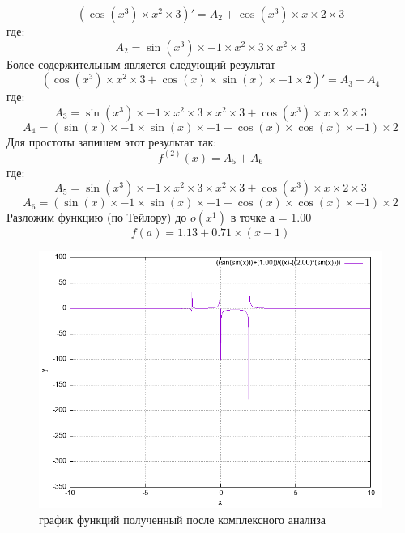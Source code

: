 \documentclass{article}
\begin{document}
\[(\cos( x ^{ 3 })\times x ^{ 2 }\times 3 )' =  A_{2} +\cos( x ^{ 3 })\times x \times 2 \times 3 \]\newline
где:\[A_{2} = \sin( x ^{ 3 })\times -1 \times x ^{ 2 }\times 3 \times x ^{ 2 }\times 3 \]
Более содержительным является следующий результат\newline
\[(\cos( x ^{ 3 })\times x ^{ 2 }\times 3 +\cos( x )\times\sin( x )\times -1 \times 2 )' =  A_{3} + A_{4} \]\newline
где:\[A_{3} = \sin( x ^{ 3 })\times -1 \times x ^{ 2 }\times 3 \times x ^{ 2 }\times 3 +\cos( x ^{ 3 })\times x \times 2 \times 3 \]
\[A_{4} = (\sin( x )\times -1 \times\sin( x )\times -1 +\cos( x )\times\cos( x )\times -1 )\times 2 \]
Для простоты запишем этот результат так:\newline
\[f^{(2)}(x) =  A_{5} + A_{6} \]\newline
где:\[A_{5} = \sin( x ^{ 3 })\times -1 \times x ^{ 2 }\times 3 \times x ^{ 2 }\times 3 +\cos( x ^{ 3 })\times x \times 2 \times 3 \]
\[A_{6} = (\sin( x )\times -1 \times\sin( x )\times -1 +\cos( x )\times\cos( x )\times -1 )\times 2 \]
Разложим функцию (по Тейлору) до $o(x^{1})$ в точке а = 1.00\newline
\[f(a) =  1.13 + 0.71 \times( x - 1 )\]\newline
\begin{figure}[h]
\centering
\includegraphics[width=0.8\linewidth]{func.png}
\caption{график функций полученный после комплексного анализа}
\label{fig:mpr}
\end{figure}
\end{document}
